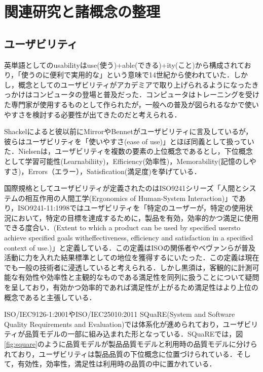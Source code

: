 \chapter{関連研究と諸概念の整理}
\label{chap:prevresearch}

\section{ユーザビリティ}

英単語としてのusabilityはuse(使う)+able(できる)+ity(こと)から構成されており，「使うのに便利で実用的な」という意味で14世紀から使われていた\cite{oed:usability}\cite{kurosu}．しかし，概念としてのユーザビリティがアカデミアで取り上げられるようになったきっかけはコンピュータの登場と普及だった\cite{kurosu}．コンピュータはトレーニングを受けた専門家が使用するものとして作られたが，一般への普及が図られるなかで使いやすさを検討する必要性が出てきたのだと考えられる．

Shackelによると彼以前にMirrorやBennetがユーザビリティに言及しているが，彼らはユーザビリティを「使いやすさ(ease of use)」とほぼ同義として扱っていた\cite{shackel1991human}\cite{kurosu}．Nielsenは，ユーザビリティを複数の要素の上位概念であるとし，下位概念として学習可能性(Learnabiliity)，Efficiency(効率性)，Memorability(記憶のしやすさ)，Errors（エラー），Satisfication(満足度)を挙げている\cite{nielsen1994}．

国際規格としてユーザビリティが定義されたのはISO9241シリーズ「人間とシステムの相互作用の人間工学(Ergonomics of Human-System Interaction)」であり，ISO9241-11:1998ではユーザビリティを「特定のユーザーが，特定の使用状況において，特定の目標を達成するために，製品を有効，効率的かつ満足に使用できる度合い．(Extent to which a product can be used by specified usersto achieve specified goals witheffectiveness, efficiency and satisfaction in a specified context of use.)」と定義している．この定義はISOの関係者やベヴァンらが普及活動に力を入れた結果標準としての地位を獲得するにいたった\cite{kurosu}．この定義は現在でも一般の技術者に浸透していると考えられる．しかし黒須は，客観的に計測可能な有効性や効率性と主観的なものである満足性を同列に扱うことについて疑問を呈しており，有効かつ効率的であれば満足性が上がるため満足性はより上位の概念であると主張している\cite{kurosu}．

ISO/IEC9126-1:2001やISO/IEC25010:2011 SQuaRE(System and Software Quality Requirements and Evaluation)では体系化が進められており，ユーザビリティが品質モデルの一部に組み込まれた形となっている．SQuaREでは，図\ref{fig:square}のように品質モデルが製品品質モデルと利用時の品質モデルに分けられており，ユーザビリティは製品品質の下位概念に位置づけられている．そして，有効性，効率性，満足性は利用時の品質の中に置かれている．

